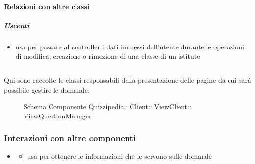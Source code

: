 \paragraph{Relazioni con altre classi}
\subparagraph{Uscenti}
\begin{itemize}
\item usa  per passare al controller i dati immessi dall'utente durante le operazioni di modifica, creazione o rimozione di una classe di un istituto
\end{itemize}
\subsection{}
Qui sono raccolte le classi responsabili della presentazione delle pagine da cui sarà possibile gestire le domande.
\begin{figure}[H]
\centering
\noindent{}
\caption[Schema Componente ViewQuestionManager]{Schema Componente Quizzipedia:: Client:: ViewClient:: ViewQuestionManager}
\end{figure}
\subsubsection{Interazioni con altre componenti}
\begin{itemize}
\item {}
\begin{itemize}
\item usa  per ottenere le informazioni che le servono sulle domande
\end{itemize}
\end{itemize}
